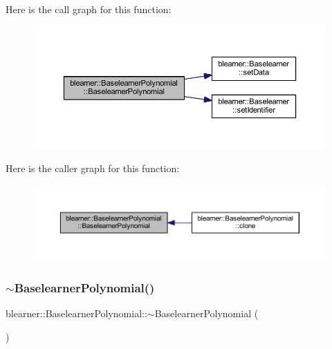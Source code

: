 Here is the call graph for this function\+:\nopagebreak
\begin{figure}[H]
\begin{center}
\leavevmode
\includegraphics[width=350pt]{classblearner_1_1_baselearner_polynomial_aba0f1e5bf9566dc7bc674c9d30b44af6_cgraph}
\end{center}
\end{figure}
Here is the caller graph for this function\+:\nopagebreak
\begin{figure}[H]
\begin{center}
\leavevmode
\includegraphics[width=350pt]{classblearner_1_1_baselearner_polynomial_aba0f1e5bf9566dc7bc674c9d30b44af6_icgraph}
\end{center}
\end{figure}
\mbox{\label{classblearner_1_1_baselearner_polynomial_abb799eceb2808fcca4c8041e2ae7abe4}} 
\subsubsection{\texorpdfstring{$\sim$\+Baselearner\+Polynomial()}{~BaselearnerPolynomial()}}
{\footnotesize\ttfamily blearner\+::\+Baselearner\+Polynomial\+::$\sim$\+Baselearner\+Polynomial (\begin{DoxyParamCaption}{ }\end{DoxyParamCaption})}



